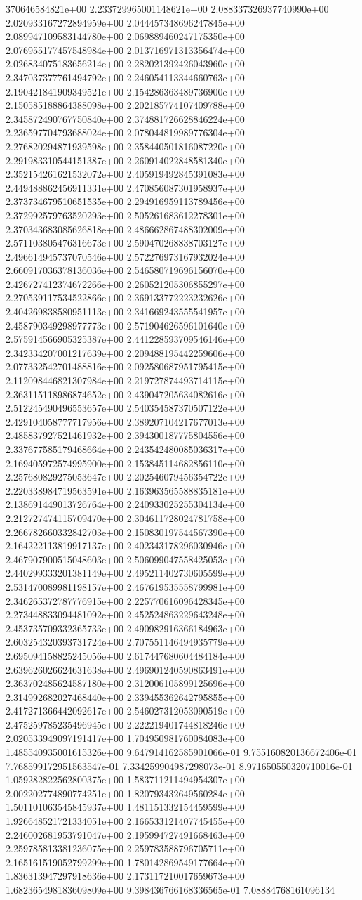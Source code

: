 370646584821e+00	2.233729965001148621e+00	2.088337326937740990e+00	2.020933167272894959e+00	2.044457348696247845e+00	2.089947109583144780e+00	2.069889460247175350e+00	2.076955177457548984e+00	2.013716971313356474e+00	2.026834075183656214e+00	2.282021392426043960e+00	2.347037377761494792e+00	2.246054113344660763e+00	2.190421841909349521e+00	2.154286363489736900e+00	2.150585188864388098e+00	2.202185774107409788e+00	2.345872490767750840e+00	2.374881726628846224e+00	2.236597704793688024e+00	2.078044819989776304e+00	2.276820294871939598e+00	2.358440501816087220e+00	2.291983310544151387e+00	2.260914022848581340e+00	2.352154261621532072e+00	2.405919492845391083e+00	2.449488862456911331e+00	2.470856087301958937e+00	2.373734679510651535e+00	2.294916959113789456e+00	2.372992579763520293e+00	2.505261683612278301e+00	2.370343683085626818e+00	2.486662867488302009e+00	2.571103805476316673e+00	2.590470268838703127e+00	2.496614945737070546e+00	2.572276973167932024e+00	2.660917036378136036e+00	2.546580719696156070e+00	2.426727412374672266e+00	2.260521205306855297e+00	2.270539117534522866e+00	2.369133772223232626e+00	2.404269838580951113e+00	2.341669243555541957e+00	2.458790349298977773e+00	2.571904626596101640e+00	2.575914566905325387e+00	2.441228593709546146e+00	2.342334207001217639e+00	2.209488195442259606e+00	2.077332542701488816e+00	2.092580687951795415e+00	2.112098446821307984e+00	2.219727874493714115e+00	2.363115118986874652e+00	2.439047205634082616e+00	2.512245490496553657e+00	2.540354587370507122e+00	2.429104058777717956e+00	2.389207104217677013e+00	2.485837927521461932e+00	2.394300187775804556e+00	2.337677585179468664e+00	2.243542480085036317e+00	2.169405972574995900e+00	2.153845114682856110e+00	2.257680829275053647e+00	2.202546079456354722e+00	2.220338984719563591e+00	2.163963565588835181e+00	2.138691449013726764e+00	2.240933025255304134e+00	2.212727474115709470e+00	2.304611728024781758e+00	2.266782660332842703e+00	2.150830197544567390e+00	2.164222113819917137e+00	2.402343178296030946e+00	2.467907900515048603e+00	2.506099047558425053e+00	2.440299333201381149e+00	2.495211402730605599e+00	2.531470089981198157e+00	2.467619535558799981e+00	2.346265372787776915e+00	2.225770616096428345e+00	2.273448833094481092e+00	2.452524863229643248e+00	2.453735709332365733e+00	2.490982916366184963e+00	2.603254320393731724e+00	2.707551146494935779e+00	2.695094158825245056e+00	2.617447680604484184e+00	2.639626026624631638e+00	2.496901240590863491e+00	2.363702485624587180e+00	2.312006105899125696e+00	2.314992682027468440e+00	2.339455362642795855e+00	2.417271366442092617e+00	2.546027312053090519e+00	2.475259785235496945e+00	2.222219401744818246e+00	2.020533949097191417e+00	1.704950981760084083e+00	1.485540935001615326e+00	9.647914162585901066e-01	9.755160820136672406e-01	7.768599172951563547e-01	7.334259904987298073e-01	8.971650550320710016e-01	1.059282822562800375e+00	1.583711211494954307e+00	2.002202774890774251e+00	1.820793432649560284e+00	1.501101063545845937e+00	1.481151332154459599e+00	1.926648521721334051e+00	2.166533121407745455e+00	2.246002681953791047e+00	2.195994727491668463e+00	2.259785813381236075e+00	2.259783588796705711e+00	2.165161519052799299e+00	1.780142869549177664e+00	1.836313947297918636e+00	2.173117210017659673e+00	1.682365498183609809e+00	9.398436766168336565e-01	7.08884768161096134